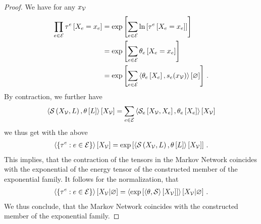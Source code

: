 \begin{proof}
    We have for any $x_{\mathcal{V}}$
    \begin{align*}
        \prod_{e\in\mathcal{E}} \tau^{e}\left[X_{e}=x_{e}\right]
        &= \mathrm{exp}\left[\sum_{e\in\mathcal{E}} \ln \left[ \tau^{e}\left[X_{e}=x_{e}\right] \right]\right] \\
        &= \mathrm{exp}\left[\sum_{e\in\mathcal{E}} \theta_{e}\left[X_{e}=x_{e}\right]\right] \\
        &= \mathrm{exp}\left[\sum_{e\in\mathcal{E}} \left\langle \theta_{e}\left[X_{e}\right],s_{e}(x_{\mathcal{V}})\right\rangle \left[ \varnothing \right]\right]  \, .
    \end{align*}
    By contraction, we further have
    \begin{align*}
        \left\langle \mathcal{S}\left(X_{\mathcal{V}},L\right),\theta\left[L\right]\right\rangle \left[ X_{\mathcal{V}} \right]
        = \sum_{e\in\mathcal{E}} \left\langle \mathcal{S}_{e}\left[X_{\mathcal{V}},X_{e}\right],\theta_{e}\left[X_{e}\right]\right\rangle \left[ X_{\mathcal{V}} \right]
    \end{align*}
    we thus get with the above
    \begin{align}
        \left\langle \{\tau^{e}: e\in\mathcal{E}\}\right\rangle \left[ X_{\mathcal{V}} \right]
        = \mathrm{exp}\left[\left\langle \mathcal{S}\left(X_{\mathcal{V}},L\right),\theta\left[L\right]\right\rangle \left[ X_{\mathcal{V}} \right]\right] \, .
    \end{align}
    This implies, that the contraction of the tensors in the Markov Network coincides with the exponential of the energy tensor of the constructed member of the exponential family.
    It follows for the normalization, that
    \begin{align}
        \left\langle \{\tau^{e}: e\in\mathcal{E}\}\right\rangle \left[ X_{\mathcal{V}} | \varnothing \right]
        = \left\langle \mathrm{exp}\left[\left\langle \theta,\mathcal{S}\right\rangle \left[ X_{\mathcal{V}} \right]\right]\right\rangle \left[ X_{\mathcal{V}} | \varnothing \right] \, .
    \end{align}
    We thus conclude, that the Markov Network coincides with the constructed member of the exponential family.
\end{proof}

